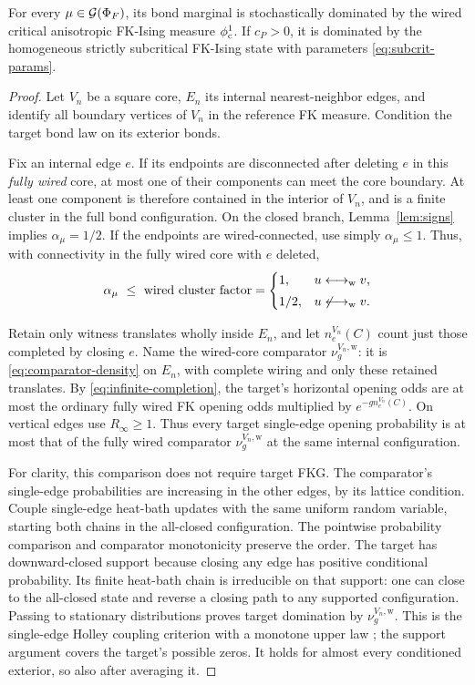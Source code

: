 \begin{proposition}\label{prop:allstates}
For every \(\mu\in\mathcal G(\Phi_F)\), its bond marginal is stochastically dominated by the wired critical anisotropic FK-Ising measure $\phi^1_{\mathrm c}$. If \(c_P>0\), it is dominated by the homogeneous strictly subcritical FK-Ising state with parameters \eqref{eq:subcrit-params}.
\end{proposition}
\begin{proof}
Let \(V_n\) be a square core, \(E_n\) its internal nearest-neighbor edges, and identify all boundary vertices of \(V_n\) in the reference FK measure. Condition the target bond law on its exterior bonds.

Fix an internal edge \(e\). If its endpoints are disconnected after deleting \(e\) in this \emph{fully wired} core, at most one of their components can meet the core boundary. At least one component is therefore contained in the interior of \(V_n\), and is a finite cluster in the full bond configuration. On the closed branch, Lemma~\ref{lem:signs} implies \(\alpha_\mu=1/2\). If the endpoints are wired-connected, use simply \(\alpha_\mu\le1\). Thus, with connectivity in the fully wired core with $e$ deleted,
\[
 \alpha_\mu\ \le\ \text{wired cluster factor}
 =\begin{cases}1,&u\longleftrightarrow_{\mathrm w}v,\\[1mm]1/2,&u\not\longleftrightarrow_{\mathrm w}v.\end{cases}
\]

Retain only witness translates wholly inside \(E_n\), and let $n_e^{V_n}(C)$ count just those completed by closing $e$. Name the wired-core comparator $\nu_g^{V_n,\mathrm w}$: it is \eqref{eq:comparator-density} on $E_n$, with complete wiring and only these retained translates. By \eqref{eq:infinite-completion}, the target's horizontal opening odds are at most the ordinary fully wired FK opening odds multiplied by \(e^{-g n_e^{V_n}(C)}\). On vertical edges use \(R_\infty\ge1\). Thus every target single-edge opening probability is at most that of the fully wired comparator \(\nu_g^{V_n,\mathrm w}\) at the same internal configuration.

For clarity, this comparison does not require target FKG. The comparator's single-edge probabilities are increasing in the other edges, by its lattice condition. Couple single-edge heat-bath updates with the same uniform random variable, starting both chains in the all-closed configuration. The pointwise probability comparison and comparator monotonicity preserve the order. The target has downward-closed support because closing any edge has positive conditional probability. Its finite heat-bath chain is irreducible on that support: one can close to the all-closed state and reverse a closing path to any supported configuration. Passing to stationary distributions proves target domination by \(\nu_g^{V_n,\mathrm w}\). This is the single-edge Holley coupling criterion with a monotone upper law \cite[Theorems 2.3 and 2.27]{Grimmett}; the support argument covers the target's possible zeros. It holds for almost every conditioned exterior, so also after averaging it.


\end{proof}
